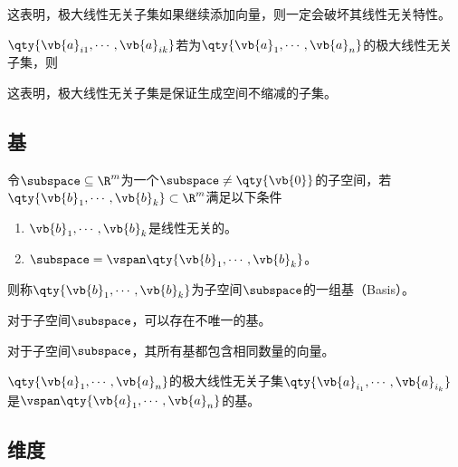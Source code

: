 这表明，极大线性无关子集如果继续添加向量，则一定会破坏其线性无关特性。

\begin{BoxProperty}[极大线性无关子集的生成空间的等价性]
    $\qty{\vb{a}_{i1},\cdots,\vb{a}_{ik}}$若为$\qty{\vb{a}_1,\cdots,\vb{a}_n}$的极大线性无关子集，则
\end{BoxProperty}

这表明，极大线性无关子集是保证生成空间不缩减的子集。

\subsection{基}

\begin{BoxDefinition}[基]
    令$\subspace\subseteq\R^m$为一个$\subspace\neq\qty{\vb{0}}$的子空间，若$\qty{\vb{b}_1,\cdots,\vb{b}_k}\subset\R^m$满足以下条件
    \begin{enumerate}
        \item $\vb{b}_1,\cdots,\vb{b}_k$是线性无关的。
        \item $\subspace=\vspan\qty{\vb{b}_1,\cdots,\vb{b}_k}$。
    \end{enumerate}
    则称$\qty{\vb{b}_1,\cdots,\vb{b}_k}$为子空间$\subspace$的一组基（Basis）。
\end{BoxDefinition}

\begin{BoxProperty}[基的不唯一性]
    对于子空间$\subspace$，可以存在不唯一的基。
\end{BoxProperty}

\begin{BoxProperty}[基的元素数量一致性]
    对于子空间$\subspace$，其所有基都包含相同数量的向量。
\end{BoxProperty}

\begin{BoxProperty}[基与极大线性无关子集]
    $\qty{\vb{a}_1,\cdots,\vb{a}_n}$的极大线性无关子集$\qty{\vb{a}_{i_1},\cdots,\vb{a}_{i_k}}$是$\vspan\qty{\vb{a}_1,\cdots,\vb{a}_n}$的基。
\end{BoxProperty}

\subsection{维度}

